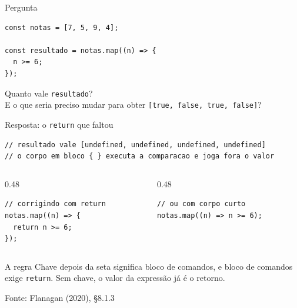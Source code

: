 \documentclass[aspectratio=169]{beamer}
\newcommand{\fonte}[1]{\vfill\hfill{\scriptsize\textcolor{UFSGray}{Fonte: #1}}}
\begin{document}
\begin{frame}[fragile]{Pergunta}
\begin{lstlisting}[style=js]
const notas = [7, 5, 9, 4];

const resultado = notas.map((n) => {
  n >= 6;
});
\end{lstlisting}
  \begin{center}
    \vspace{0.4em}
    {\large Quanto vale \texttt{resultado}?}\\[0.4em]
    {\small E o que seria preciso mudar para obter
     \texttt{[true, false, true, false]}?}
  \end{center}
\end{frame}

\begin{frame}[fragile]{Resposta: o \texttt{return} que faltou}
\begin{lstlisting}[style=js]
// resultado vale [undefined, undefined, undefined, undefined]
// o corpo em bloco { } executa a comparacao e joga fora o valor
\end{lstlisting}
  \begin{columns}[T]
    \begin{column}{0.48\textwidth}
\begin{lstlisting}[style=jsx]
// corrigindo com return
notas.map((n) => {
  return n >= 6;
});
\end{lstlisting}
    \end{column}
    \begin{column}{0.48\textwidth}
\begin{lstlisting}[style=jsx]
// ou com corpo curto
notas.map((n) => n >= 6);
\end{lstlisting}
    \end{column}
  \end{columns}
  \begin{alertblock}{A regra}
    Chave depois da seta significa bloco de comandos, e bloco de comandos
    exige \texttt{return}. Sem chave, o valor da expressão já é o retorno.
  \end{alertblock}
  \fonte{Flanagan (2020), \S 8.1.3~\cite{flanagan2020javascript}}
\end{frame}
\end{document}
